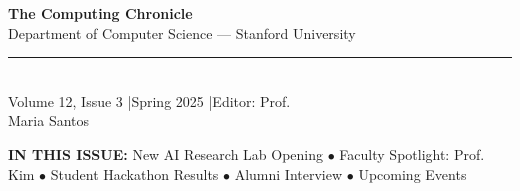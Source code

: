 \documentclass[10pt,a4paper]{article}
\begin{document}

\vspace*{-1.5cm}
\begin{center}
  {\color{white}\fontsize{36}{44}\selectfont\bfseries The Computing Chronicle}\\[6pt]
  {\color{white!80}\large Department of Computer Science --- Stanford University}\\[4pt]
  {\color{accent}\rule{6cm}{2pt}}\\[4pt]
  {\color{white!70}\small Volume 12, Issue 3 \quad|\quad Spring 2025 \quad|\quad Editor: Prof.\\ Maria Santos}
\end{center}

\vspace{0.8cm}

\colorbox{lightbg}{%
\begin{minipage}{\dimexpr\textwidth-2\fboxsep}
\centering\small\color{darktext}
\textbf{IN THIS ISSUE:}\quad
New AI Research Lab Opening $\bullet$
Faculty Spotlight: Prof.\\ Kim $\bullet$
Student Hackathon Results $\bullet$
Alumni Interview $\bullet$
Upcoming Events
\end{minipage}}

\vspace{0.6cm}
\end{document}
